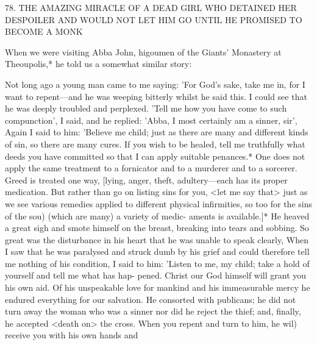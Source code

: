 78. THE AMAZING MIRACLE OF A DEAD GIRL
WHO DETAINED HER DESPOILER
AND WOULD NOT LET HIM GO
UNTIL HE PROMISED TO BECOME A MONK

When we were visiting Abba John, higoumen of the Giants'
Monastery at Theoupolis,* he told us a somewhat similar story:

Not long ago a young man came to me saying: 'For God's sake,
take me in, for I want to repent\textquotesingle —and he was weeping bitterly
whilst he said this. I could see that he was deeply troubled and
perplexed. 'Tell me how you have come to such compunction', I
said, and he replied: 'Abba, I most certainly am a sinner, sir', Again
I said to him: 'Believe me child; just as there are many and different
kinds of sin, so there are many cures. If you wish to be healed, tell
me truthfully what deeds you have committed so that I can apply
suitable penances.* One does not apply the same treatment to a
fornicator and to a murderer and to a sorcerer. Greed is treated one
way, [lying, anger, theft, adultery—each has its proper medication.
But rather than go on listing sins for you, <let me say that> just as
we see various remedies applied to different physical infirmities, so
too for the sins of the sou) (which are many) a variety of medic-
aments is available.]* He heaved a great sigh and smote himself on
the breast, breaking into tears and sobbing. So great was the
disturbance in his heart that he was unable to speak clearly, When
I saw that he was paralysed and struck dumb by his grief and could
therefore tell me nothing of his condition, I said to him: 'Listen to
me, my child; take a hold of yourself and tell me what has hap-
pened. Christ our God himself will grant you his own aid. Of his
unspeakable love for mankind and his immeasurable mercy he
endured everything for our salvation. He consorted with publicans;
he did not turn away the woman who was a sinner nor did he reject
the thief; and, finally, he accepted <death on> the cross. When you
repent and turn to him, he wil) receive you with his own hands and

